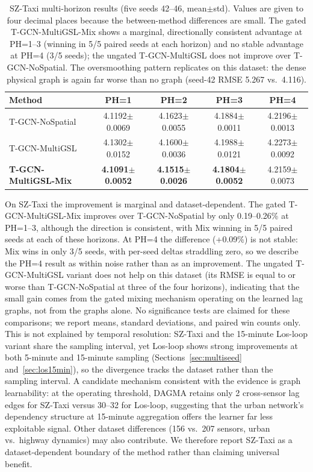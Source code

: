 \begin{table}[t]
\centering
\caption{SZ-Taxi multi-horizon results (five seeds 42--46, mean$\pm$std). Values are given to four decimal places because the between-method differences are small. The gated T-GCN-MultiGSL-Mix shows a marginal, directionally consistent advantage at PH=1--3 (winning in 5/5 paired seeds at each horizon) and no stable advantage at PH=4 (3/5 seeds); the ungated T-GCN-MultiGSL does not improve over T-GCN-NoSpatial. The oversmoothing pattern replicates on this dataset: the dense physical graph is again far worse than no graph (seed-42 RMSE 5.267 vs.\ 4.116).}
\label{tab:sz_multiph}
\begin{tabular}{lcccc}
\toprule
\textbf{Method} & \textbf{PH=1} & \textbf{PH=2} & \textbf{PH=3} & \textbf{PH=4} \\
\midrule
T-GCN-NoSpatial & 4.1192$\pm$0.0069 & 4.1623$\pm$0.0055 & 4.1884$\pm$0.0011 & 4.2196$\pm$0.0013 \\
T-GCN-MultiGSL & 4.1302$\pm$0.0152 & 4.1600$\pm$0.0036 & 4.1988$\pm$0.0121 & 4.2273$\pm$0.0092 \\
\textbf{T-GCN-MultiGSL-Mix} & \textbf{4.1091$\pm$0.0052} & \textbf{4.1515$\pm$0.0026} & \textbf{4.1804$\pm$0.0052} & 4.2159$\pm$0.0073 \\
\bottomrule
\end{tabular}
\end{table}

On SZ-Taxi the improvement is marginal and dataset-dependent. The gated T-GCN-MultiGSL-Mix improves over T-GCN-NoSpatial by only 0.19--0.26\% at PH=1--3, although the direction is consistent, with Mix winning in 5/5 paired seeds at each of these horizons. At PH=4 the difference (+0.09\%) is not stable: Mix wins in only 3/5 seeds, with per-seed deltas straddling zero, so we describe the PH=4 result as within noise rather than as an improvement. The ungated T-GCN-MultiGSL variant does not help on this dataset (its RMSE is equal to or worse than T-GCN-NoSpatial at three of the four horizons), indicating that the small gain comes from the gated mixing mechanism operating on the learned lag graphs, not from the graphs alone. No significance tests are claimed for these comparisons; we report means, standard deviations, and paired win counts only. This is not explained by temporal resolution: SZ-Taxi and the 15-minute Los-loop variant share the sampling interval, yet Los-loop shows strong improvements at both 5-minute and 15-minute sampling (Sections~\ref{sec:multiseed} and~\ref{sec:los15min}), so the divergence tracks the dataset rather than the sampling interval. A candidate mechanism consistent with the evidence is graph learnability: at the operating threshold, DAGMA retains only 2 cross-sensor lag edges for SZ-Taxi versus 30--32 for Los-loop, suggesting that the urban network's dependency structure at 15-minute aggregation offers the learner far less exploitable signal. Other dataset differences (156 vs.\ 207 sensors, urban vs.\ highway dynamics) may also contribute. We therefore report SZ-Taxi as a dataset-dependent boundary of the method rather than claiming universal benefit.
